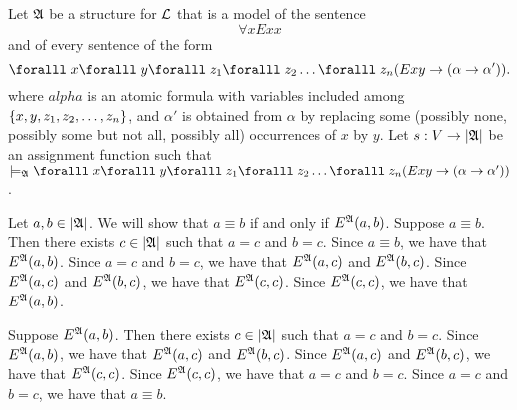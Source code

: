 \begin{Answer}
  Let $\mathfrak{A}$ be a structure for $\mathcal{L}$ that is a model of the sentence
  \[ \forall xExx \]
  and of every sentence of the form
  \[
    \forall x \forall y \forall z_1 \forall z_2 \ldots \forall z_n
    (Exy \lto (\alpha \lto \alpha')).
  \]
  where $
  alpha$ is an atomic formula with variables included among
  $\left\{x,y,z_1,z_2,\ldots,z_n\right\}$, and $\alpha'$ is
  obtained from $\alpha$ by replacing some
  (possibly none, possibly some but not all, possibly all)
  occurrences of $x$ by $y$.
  Let $s : V \rightarrow \lvert\mathfrak{A}\rvert$ be an assignment function such that
  $\models_{\frakA} \forall x \forall y \forall z_1 \forall z_2 \ldots \forall z_n
  (Exy \lto (\alpha \lto \alpha'))$.

  \step
  Let $a,b \in \lvert\mathfrak{A}\rvert$.
  We will show that $a \equiv b$ if and only if $E^{\mathfrak{A}}(a,b)$.
  Suppose $a \equiv b$.
  Then there exists $c \in \lvert\mathfrak{A}\rvert$ such that $a = c$ and $b = c$.
  Since $a \equiv b$, we have that $E^{\mathfrak{A}}(a,b)$.
  Since $a = c$ and $b = c$, we have that $E^{\mathfrak{A}}(a,c)$ and $E^{\mathfrak{A}}(b,c)$.
  Since $E^{\mathfrak{A}}(a,c)$ and $E^{\mathfrak{A}}(b,c)$, we have that $E^{\mathfrak{A}}(c,c)$.
  Since $E^{\mathfrak{A}}(c,c)$, we have that $E^{\mathfrak{A}}(a,b)$.

  \step
  Suppose $E^{\mathfrak{A}}(a,b)$.
  Then there exists $c \in \lvert\mathfrak{A}\rvert$ such that $a = c$ and $b = c$.
  Since $E^{\mathfrak{A}}(a,b)$, we have that $E^{\mathfrak{A}}(a,c)$ and $E^{\mathfrak{A}}(b,c)$.
  Since $E^{\mathfrak{A}}(a,c)$ and $E^{\mathfrak{A}}(b,c)$, we have that $E^{\mathfrak{A}}(c,c)$.
  Since $E^{\mathfrak{A}}(c,c)$, we have that $a = c$ and $b = c$.
  Since $a = c$ and $b = c$, we have that $a \equiv b$.

\end{Answer}
